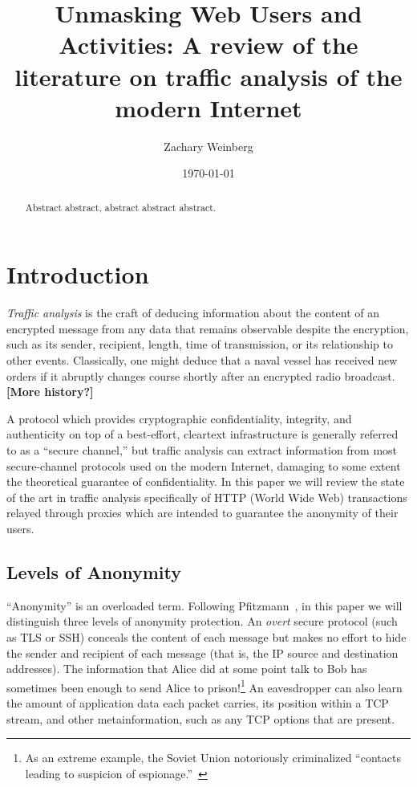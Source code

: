 \documentclass{zarticle}
\def\todo#1{{\color{todocolor}\bfseries [#1]}}
\begin{document}
\title{Unmasking Web Users and Activities:
  A review of the literature on traffic analysis of the modern Internet}
\author{Zachary Weinberg}
\date{\today}
\maketitle

\begin{abstract}
Abstract abstract, abstract abstract abstract.
\end{abstract}

\section{Introduction}

\emph{Traffic analysis} is the craft of deducing information about the
content of an encrypted message from any data that remains observable
despite the encryption, such as its sender, recipient, length, time of
transmission, or its relationship to other events.  Classically, one
might deduce that a naval vessel has received new orders if it
abruptly changes course shortly after an encrypted radio broadcast.
\todo{More history?}

A protocol which provides cryptographic confidentiality, integrity,
and authenticity on top of a best-effort, cleartext infrastructure is
generally referred to as a “secure channel,” but traffic analysis can
extract information from most secure-channel protocols used on the
modern Internet, damaging to some extent the theoretical guarantee of
confidentiality.  In this paper we will review the state of the art in
traffic analysis specifically of HTTP (World Wide Web) transactions
relayed through proxies which are intended to guarantee the anonymity
of their users.

\subsection{Levels of Anonymity}

“Anonymity” is an overloaded term.  Following
Pfitzmann~\cite{pfitzmann2010terminology}, in this paper we will
distinguish three levels of anonymity protection.  An \emph{overt}
secure protocol (such as TLS or SSH) conceals the content of each
message but makes no effort to hide the sender and recipient of each
message (that is, the IP source and destination addresses).  The
information that Alice did at some point talk to Bob has sometimes
been enough to send Alice to prison!\footnote{As an extreme example,
  the Soviet Union notoriously criminalized “contacts leading to
  suspicion of espionage.”~\cite{solzh1974gulag:svpsh}} An
eavesdropper can also learn the amount of application data each packet
carries, its position within a TCP stream, and other metainformation,
such as any TCP options that are present.
\end{document}
